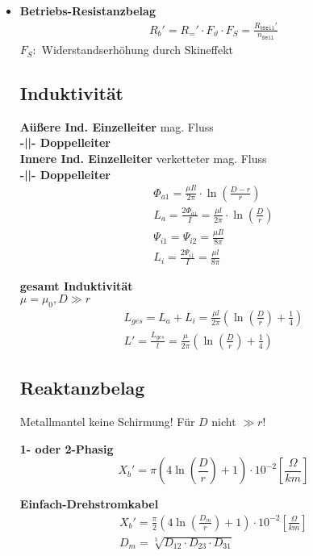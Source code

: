 \begin{itemize}
\item[]{\textbf{Betriebs-Resistanzbelag}}
\begin{gather*}
    R_{b}' = R_{=}' \cdot F_{\vartheta} \cdot F_{S} = \frac{R_{b\mathtt{Seil}}'}{n_{\mathtt{Seil}}}
\end{gather*}
$F_S:$ Widerstandserhöhung durch Skineffekt
\newpage

\subsection{Induktivität}
\textbf{Aüßere Ind. Einzelleiter} \textcolor{dgreen}{mag. Fluss}\\
\textbf{-||- Doppelleiter}\\
\textbf{Innere Ind. Einzelleiter} \textcolor{dgreen}{verketteter mag. Fluss}\\
\textbf{-||- Doppelleiter}
\begin{gather*}
    \Phi_{a1} = \frac{\mu I l}{2 \pi} \cdot \ln \left( \frac{D-r}{r}\right)\\
    L_{a} = \frac{2\Phi_{a1}}{I} = \frac{\mu l}{2 \pi} \cdot \ln \left( \frac{D}{r}\right)\\
    \Psi_{i1} = \Psi_{i2} = \frac{\mu I l}{8 \pi}\\
    L_{i} = \frac{2\Psi_{i1}}{I} = \frac{\mu l}{8 \pi}
\end{gather*}

\textbf{gesamt Induktivität}\\
\textcolor{dgreen}{$\mu = \mu_{0}, D \gg r$}
\begin{gather*}
    L_{ges} = L_{a} + L_{i} = \frac{\mu l}{2\pi} \left( \ln \left(\frac{D}{r}\right) + \frac{1}{4}\right)\\
    L' = \frac{L_{ges}}{l} = \frac{\mu }{2\pi} \left( \ln \left(\frac{D}{r}\right) + \frac{1}{4}\right)
\end{gather*}

\subsection{Reaktanzbelag}
Metallmantel keine Schirmung! Für $D$ nicht $\gg r$!

\textbf{1- oder 2-Phasig}
\begin{equation*}
    X_{b}' = \pi \left( 4 \ln \left( \frac{D}{r}\right) +1 \right) \cdot 10 ^{-2}   \left[\frac{\Omega}{km}\right]
\end{equation*}

\textbf{Einfach-Drehstromkabel}
\begin{gather*}
    X_{b}' = \frac{\pi}{2} \left( 4 \ln \left( \frac{D_{m}}{r}\right) +1 \right) \cdot 10 ^{-2}   \left[\frac{\Omega}{km}\right]\\
    D_{m} = \sqrt[3]{D_{12} \cdot D_{23} \cdot D_{31}}
\end{gather*}


\end{itemize}
